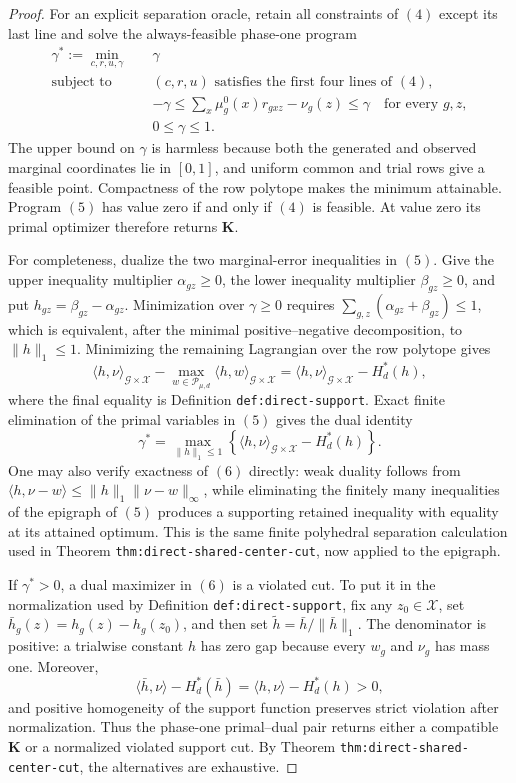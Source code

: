 \documentclass{article}
\begin{document}
\begin{proof}
For an explicit separation oracle, retain all constraints of \((4)\) except its last line and solve the always-feasible phase-one program
\[
\begin{aligned}
 \gamma^*:=\min_{c,r,u,\gamma}\quad &\gamma\\
 \text{subject to}\quad
 & (c,r,u)\text{ satisfies the first four lines of }(4),\\
 &-\gamma\le \sum_x\mu_g^0(x)r_{gxz}-\nu_g(z)\le\gamma
       \quad\text{for every }g,z,\\
 &0\le\gamma\le1.
\end{aligned}
\tag{5}
\]
The upper bound on \(\gamma\) is harmless because both the generated and observed marginal coordinates lie in \([0,1]\), and uniform common and trial rows give a feasible point.  Compactness of the row polytope makes the minimum attainable.  Program \((5)\) has value zero if and only if \((4)\) is feasible.  At value zero its primal optimizer therefore returns \(\mathbf K\).

For completeness, dualize the two marginal-error inequalities in \((5)\).  Give the upper inequality multiplier \(\alpha_{gz}\ge0\), the lower inequality multiplier \(\beta_{gz}\ge0\), and put \(h_{gz}=\beta_{gz}-\alpha_{gz}\).  Minimization over \(\gamma\ge0\) requires
\(\sum_{g,z}(\alpha_{gz}+\beta_{gz})\le1\), which is equivalent, after the minimal positive--negative decomposition, to \(\|h\|_1\le1\).  Minimizing the remaining Lagrangian over the row polytope gives
\[
 \langle h,\nu\rangle_{\mathcal G\times\mathcal X}
 -\max_{w\in\mathcal P_{\mu,d}}
      \langle h,w\rangle_{\mathcal G\times\mathcal X}
 =\langle h,\nu\rangle_{\mathcal G\times\mathcal X}-H_d^*(h),
\]
where the final equality is Definition \texttt{def:direct-support}.  Exact finite elimination of the primal variables in \((5)\) gives the dual identity
\[
 \gamma^*
 =\max_{\|h\|_1\le1}
   \left\{\langle h,\nu\rangle_{\mathcal G\times\mathcal X}-H_d^*(h)\right\}.
 \tag{6}
\]
One may also verify exactness of \((6)\) directly: weak duality follows from
\(\langle h,\nu-w\rangle\le\|h\|_1\|\nu-w\|_\infty\), while eliminating the finitely many inequalities of the epigraph of \((5)\) produces a supporting retained inequality with equality at its attained optimum.  This is the same finite polyhedral separation calculation used in Theorem \texttt{thm:direct-shared-center-cut}, now applied to the epigraph.

If \(\gamma^*>0\), a dual maximizer in \((6)\) is a violated cut.  To put it in the normalization used by Definition \texttt{def:direct-support}, fix any \(z_0\in\mathcal X\), set
\(\bar h_g(z)=h_g(z)-h_g(z_0)\), and then set
\(\widetilde h=\bar h/\|\bar h\|_1\).  The denominator is positive: a trialwise constant \(h\) has zero gap because every \(w_g\) and \(\nu_g\) has mass one.  Moreover,
\[
 \langle \bar h,\nu\rangle-H_d^*(\bar h)
 =\langle h,\nu\rangle-H_d^*(h)>0,
\]
and positive homogeneity of the support function preserves strict violation after normalization.  Thus the phase-one primal--dual pair returns either a compatible \(\mathbf K\) or a normalized violated support cut.  By Theorem \texttt{thm:direct-shared-center-cut}, the alternatives are exhaustive.


\end{proof}
\end{document}
